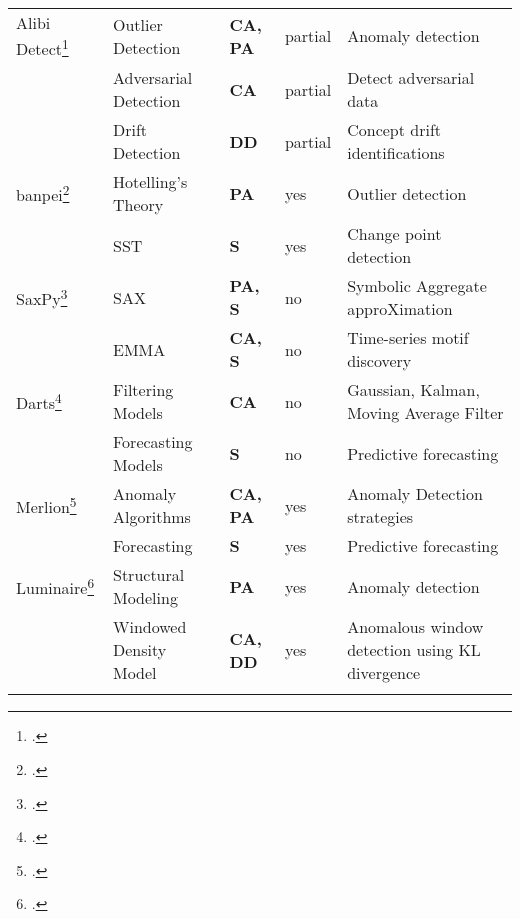 \begin{longtable}{llllP{2.75cm}}
    Alibi Detect\footcite{alibi-detect} & Outlier Detection & \textbf{CA, PA} & partial & Anomaly detection\\
    & Adversarial Detection & \textbf{CA} & partial & Detect adversarial data \\
    & Drift Detection & \textbf{DD} & partial & Concept drift identifications \\
    \midrule 
    banpei\footcite{banpei} & Hotelling's Theory &  \textbf{PA} & yes & Outlier detection\\
    & SST & \textbf{S} & yes & Change point detection \\
    \midrule 
    SaxPy\footcite{senin2018grammarviz-saxpy} & SAX &  \textbf{PA, S} & no & Symbolic Aggregate approXimation \\
    & EMMA & \textbf{CA, S} & no & Time-series motif discovery\\
    \midrule 
    Darts\footcite{herzen2021darts} & Filtering Models & \textbf{CA} & no & Gaussian, Kalman, Moving Average Filter \\
    & Forecasting Models & \textbf{S} & no & Predictive forecasting \\
    \midrule 
    Merlion\footcite{bhatnagar2021merlion} & Anomaly Algorithms &  \textbf{CA, PA} & yes & Anomaly Detection strategies \\
    & Forecasting & \textbf{S} & yes & Predictive forecasting \\
    \midrule 
    Luminaire\footcite{chakraborty2020building-luminaire} & Structural Modeling &  \textbf{ PA } & yes & Anomaly detection \\
    & Windowed Density Model & \textbf{CA, DD} & yes & Anomalous window detection using KL divergence \\
    \label{tab:anom_detect_lib}
\end{longtable}

